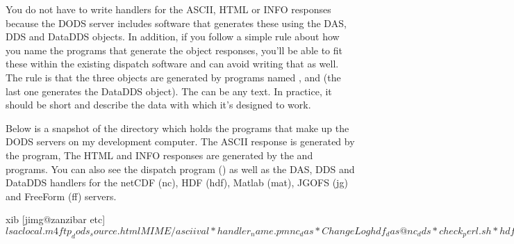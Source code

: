 \documentclass{dods-paper}
\begin{document}
You do not have to write handlers for the ASCII, HTML or INFO
responses because the DODS server includes software that generates
these using the DAS, DDS and DataDDS objects. In addition, if you
follow a simple rule about how you name the programs that generate the
object responses, you'll be able to fit these within the existing
dispatch software and can avoid writing that as well.  The rule is
that the three objects are generated by programs named
,  and
 (the last one generates the DataDDS object).
The  can be any text. In practice, it should be short and
describe the data with which it's designed to work.
 
Below is a snapshot of the directory which holds the programs that
make up the DODS servers on my development computer. The ASCII
response is generated by the  program, The HTML and INFO
responses are generated by the  and 
programs. You can also see the dispatch program () as
well as the DAS, DDS and DataDDS handlers for the netCDF (nc), HDF (hdf),
Matlab (mat), JGOFS (jg) and FreeForm (ff) servers.
 
\begin{vcode}{xib}
[jimg@zanzibar etc]$ ls
aclocal.m4            ftp_dods_source.html   MIME/
asciival*             handler_name.pm        nc_das*
ChangeLog             hdf_das@               nc_dds*
check_perl.sh*        hdf_dds@               nc_dods*
common_tests.exp      hdf_dods*              nightly_dods_build.conf
config.guess*         HTML/
nightly_dods_build.conf.example
config.sub*           HTTP/                  nightly_dods_build.sh*
COPYRIGHT             INSTALL-clients        nph-dods*
CVS/                  INSTALL-matlab-client  nph-dods.in*
cvsdate*              installServers         printenv*
def*                  INSTALL-servers        README
deflate*              install-sh*            README-Matlab-GUI
depend.sh*            jg_das*                tar-builder.pl*
DODS_Cache.pm         jg_dds*                test-dispatch.sh*
DODS_Dispatch.pm      jg_dods*               ud_aclocal.m4
dods.ini              jgofs_objects_readme*  update-manifest.pl*
ff_das*               localize.sh*           update-manifest.pl~*
ff_dds*               LWP/                   usage*
ff_dods*              Makefile.common        usage~*
FilterDirHTML.pm      mat_das*               usage-jg*
ftp_dods_binary.html  mat_dds*               www_int*
ftp_dods_ml_gui.html  mat_dods*
[jimg@zanzibar etc]$ 
\end{vcode}
\end{document}

